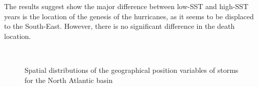 The results suggest show the major difference between low-SST and high-SST years is the location of the genesis of the hurricanes, as it seems to be displaced to the South-East. However, there is no significant difference in the death location.
\begin{figure}[H]
	\centering
	\\
	\caption{Spatial distributions of the geographical position variables of storms for the North Atlantic basin}
	\label{fig:natl-positions}
\end{figure}

